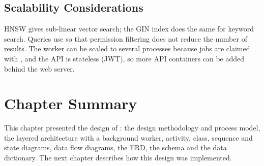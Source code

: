 \subsection{Scalability Considerations}
HNSW gives sub-linear vector search; the GIN index does the same for keyword search. Queries use
 so that permission filtering does not reduce the number of results. The
worker can be scaled to several processes because jobs are claimed with , and the API
is stateless (JWT), so more API containers can be added behind the web server.

\section{Chapter Summary}
This chapter presented the design of \sysname{}: the design methodology and process model, the layered
architecture with a background worker, activity, class, sequence and state diagrams, data flow diagrams,
the ERD, the schema and the data dictionary. The next chapter describes how this design was implemented.
